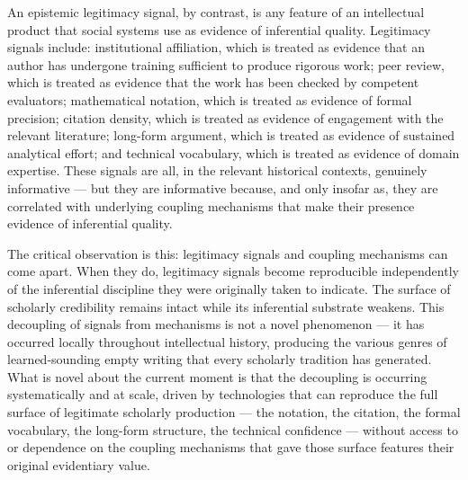 \documentclass[12pt, openright, twoside]{book}
\begin{document}
An epistemic legitimacy signal, by contrast, is any feature of an intellectual
product that social systems use as evidence of inferential quality. Legitimacy
signals include: institutional affiliation, which is treated as evidence that
an author has undergone training sufficient to produce rigorous work; peer
review, which is treated as evidence that the work has been checked by
competent evaluators; mathematical notation, which is treated as evidence of
formal precision; citation density, which is treated as evidence of engagement
with the relevant literature; long-form argument, which is treated as evidence
of sustained analytical effort; and technical vocabulary, which is treated as
evidence of domain expertise. These signals are all, in the relevant historical
contexts, genuinely informative --- but they are informative because, and only
insofar as, they are correlated with underlying coupling mechanisms that make
their presence evidence of inferential quality.

The critical observation is this: legitimacy signals and coupling mechanisms
can come apart. When they do, legitimacy signals become reproducible
independently of the inferential discipline they were originally taken to
indicate. The surface of scholarly credibility remains intact while its
inferential substrate weakens. This decoupling of signals from mechanisms is
not a novel phenomenon --- it has occurred locally throughout intellectual
history, producing the various genres of learned-sounding empty writing that
every scholarly tradition has generated. What is novel about the current moment
is that the decoupling is occurring systematically and at scale, driven by
technologies that can reproduce the full surface of legitimate scholarly
production --- the notation, the citation, the formal vocabulary, the
long-form structure, the technical confidence --- without access to or dependence
on the coupling mechanisms that gave those surface features their original
evidentiary value.
\end{document}
